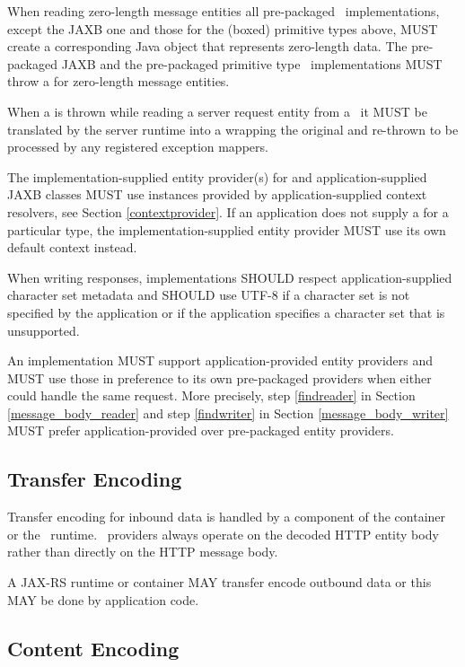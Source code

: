 When reading zero-length message entities all pre-packaged \MsgRead\ implementations, except the JAXB one and those for the (boxed) primitive types above, MUST create a corresponding Java object that represents zero-length data. The pre-packaged JAXB and the pre-packaged primitive type \MsgRead\ implementations MUST throw a  for zero-length message entities. 

When a  is thrown while reading a server request entity from a \MsgRead\, it MUST be translated by the server runtime into a  wrapping the original  and re-thrown to be processed by any registered exception mappers.

The implementation-supplied entity provider(s) for  and application-supplied JAXB classes MUST use  instances provided by application-supplied context resolvers, see Section \ref{contextprovider}. If an application does not supply a  for a particular type, the implementation-supplied entity provider MUST use its own default context instead.

When writing responses, implementations SHOULD respect application-supplied character set metadata and SHOULD use UTF-8 if a character set is not specified by the application or if the application specifies a character set that is unsupported.

An implementation MUST support application-provided entity providers and MUST use those in preference to its own pre-packaged providers when either could handle the same request. More precisely, step \ref{findreader} in Section \ref{message_body_reader} and step \ref{findwriter} in Section \ref{message_body_writer} MUST prefer application-provided over pre-packaged entity providers.

\subsection{Transfer Encoding}
\label{transfer_encoding}

Transfer encoding for inbound data is handled by a component of the container or the \jaxrs\ runtime. \MsgRead\ providers always operate on the decoded HTTP entity body rather than directly on the HTTP message body.

A JAX-RS runtime or container MAY transfer encode outbound data or this MAY be done by application code.

\subsection{Content Encoding}

